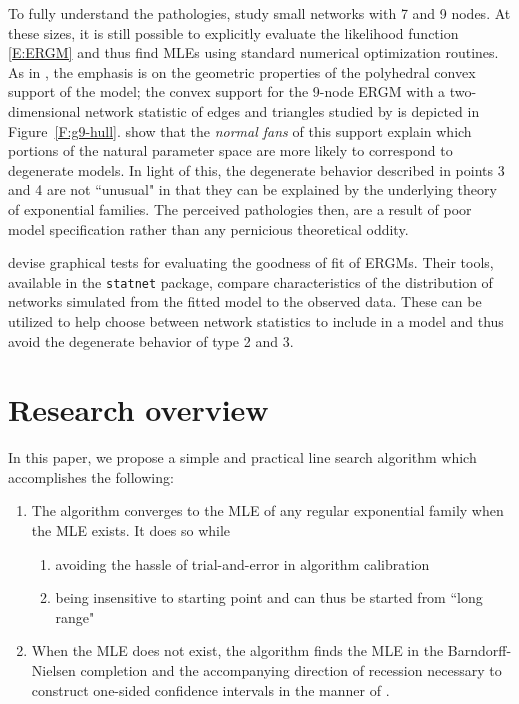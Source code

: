 To fully understand the pathologies, \citeauthor{Handcock:degeneracy,Rinaldo:2009}
study small networks with 7 and 9 nodes.  At these sizes, it is still 
possible to explicitly evaluate the likelihood function \eqref{E:ERGM} and thus 
find MLEs using standard numerical optimization routines.  
As in \citep{Geyer:gdor}, the emphasis is on the geometric properties of the 
polyhedral convex support of the model;
the convex support for the 9-node ERGM with a two-dimensional network statistic of
edges and triangles
studied by \citeauthor{Rinaldo:2009} is depicted in Figure~\ref{F:g9-hull}.
\citeauthor{Rinaldo:2009} show that the \emph{normal fans} of this support 
explain which portions of the natural parameter space are more likely to correspond to 
degenerate models.  In light of this, the degenerate behavior described in 
points 3 and 4 are not ``unusual" in that they can be explained by the underlying
theory of exponential families.  The perceived pathologies then, are a result of 
poor model specification rather than any pernicious theoretical oddity.

\citet*{GOF} devise graphical tests for evaluating the goodness of fit of ERGMs.
Their tools, available in the \texttt{statnet} package, compare characteristics of 
the distribution of networks simulated from the fitted model to the observed data.
These can be utilized to help choose between network statistics to include in a 
model and thus avoid the degenerate behavior of type 2 and 3. 

%


\section{Research overview} 
In this paper, we propose a simple and practical line search algorithm which
accomplishes the following:
\begin{enumerate}
\item The algorithm converges to the MLE of any regular exponential family 
when the MLE exists.  It does so while
\begin{enumerate}
	\item avoiding the hassle of trial-and-error in algorithm calibration
	\item being insensitive to starting point and can thus be started from ``long range"
\end{enumerate}
\item When the MLE does not exist, the algorithm finds the MLE in the Barndorff-Nielsen completion and the 
accompanying direction of recession necessary to construct one-sided 
confidence intervals in the manner of \citep{Geyer:gdor}.
\end{enumerate}

